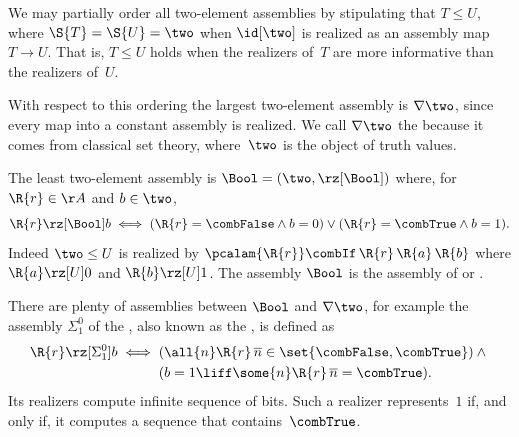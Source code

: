 We may partially order all two-element assemblies by stipulating that $T \leq U$, where $\S{T} = \S{U} = \two$ when $\id[\two]$ is realized as an assembly map $T \to U$.
That is, $T \leq U$ holds when the realizers of~$T$ are more informative than the realizers of~$U$.

With respect to this ordering the largest two-element assembly is $\nabla \two$, since every map into a constant assembly is realized. We call $\nabla \two$ the  because it comes from classical set theory, where~$\two$ is the object of truth values.

The least two-element assembly is $\Bool = (\two, {\rz[\Bool]})$ where, for $\R{r} \in \AA$ and $b \in \two$,
%
\begin{equation*}
  \R{r} \rz[\Bool] b
  \iff
  (\R{r} = \combFalse \land b = 0) \lor
  (\R{r} = \combTrue \land b = 1).
\end{equation*}
%
Indeed $\two \leq U$ is realized by $\pcalam{\R{r}} \combIf\,\R{r}\,\R{a}\,\R{b}$ where $\R{a} \rz[U] 0$ and $\R{b} \rz[U] 1$.
%
The assembly $\Bool$ is the assembly of  or .

There are plenty of assemblies between $\Bool$ and $\nabla \two$, for example the assembly $\Sigma^0_1$ of the , also known as the , is defined as
%
\begin{equation*}
  \R{r} \rz[\Sigma^0_1] b
  \iff
  \begin{aligned}[t]
  & (\all{n} \R{r}\,\overline{n} \in \set{\combFalse, \combTrue})
  \land {} \\
  & (b = 1 \liff \some{n} \R{r}\,\overline{n} = \combTrue).
  \end{aligned}
\end{equation*}
%
Its realizers compute infinite sequence of bits. Such a realizer represents~$1$ if, and only if, it computes a sequence that contains~$\combTrue$.

